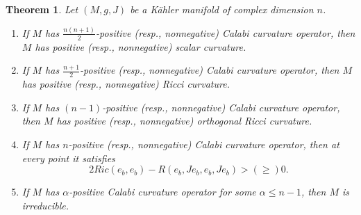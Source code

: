 \documentclass[10pt,a4paper]{amsart}
\newtheorem{theorem}{Theorem}
\begin{document}
\begin{theorem}
\label{theorem1.1}
Let $\left( {M,g,J} \right)$ be a K{\"a}hler manifold of complex dimension $n$.
\begin{enumerate}
\item If $M$ has $\frac{{n\left(n + 1\right)}}{2}$-positive (resp., nonnegative) Calabi curvature operator, then $M$ has positive (resp., nonnegative) scalar curvature.
\item If $M$ has $\frac{{n + 1}}{2}$-positive (resp., nonnegative) Calabi curvature operator, then $M$ has positive (resp., nonnegative) Ricci curvature.
\item If $M$ has $\left(n-1\right)$-positive (resp., nonnegative) Calabi curvature operator, then $M$ has positive (resp., nonnegative) orthogonal Ricci curvature.
\item If $M$ has $n$-positive (resp., nonnegative) Calabi curvature operator, then at every point it satisfies
$$2{Ric\left( {{e_b},{e_b}} \right) - R\left( {{e_b},J{e_b},{e_b},J{e_b}} \right)}> \left( \ge \right) 0.$$

\item If $M$ has $\alpha $-positive Calabi curvature operator for some $\alpha  \le n-1$, then $M$ is irreducible.
\end{enumerate}
\end{theorem}
\end{document}
